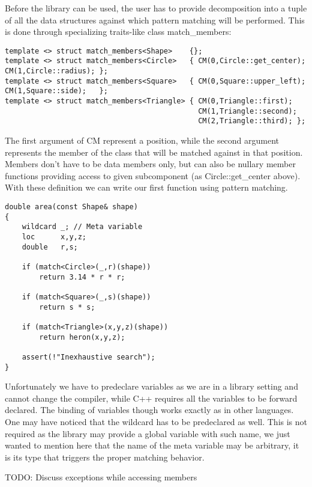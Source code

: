 \documentclass[submission,copyright]{eptcs}
\begin{document}
Before the library can be used, the user has to provide decomposition into a 
tuple of all the data structures against which pattern matching will be 
performed. This is done through specializing traits-like class match\_members:

\begin{lstlisting}
template <> struct match_members<Shape>    {};
template <> struct match_members<Circle>   { CM(0,Circle::get_center); CM(1,Circle::radius); };
template <> struct match_members<Square>   { CM(0,Square::upper_left); CM(1,Square::side);   };
template <> struct match_members<Triangle> { CM(0,Triangle::first);    
                                             CM(1,Triangle::second); 
                                             CM(2,Triangle::third); };
\end{lstlisting}

The first argument of CM represent a position, while the second argument 
represents the member of the class that will be matched against in that position. 
Members don't have to be data members only, but can also be nullary member 
functions providing access to given subcomponent (as Circle::get\_center above).
With these definition we can write our first function using pattern matching.

\begin{lstlisting}
double area(const Shape& shape)
{
    wildcard _; // Meta variable
    loc      x,y,z;
    double   r,s;

    if (match<Circle>(_,r)(shape))
        return 3.14 * r * r;

    if (match<Square>(_,s)(shape))
        return s * s;

    if (match<Triangle>(x,y,z)(shape))
        return heron(x,y,z);

    assert(!"Inexhaustive search");
}
\end{lstlisting}

Unfortunately we have to predeclare variables as we are in a library setting and 
cannot change the compiler, while C++ requires all the variables to be forward 
declared. The binding of variables though works exactly as in other languages. 
One may have noticed that the wildcard has to be predeclared as well. This is 
not required as the library may provide a global variable with such name, we 
just wanted to mention here that the name of the meta variable may be arbitrary, 
it is its type that triggers the proper matching behavior.

TODO: Discuss exceptions while accessing members
\end{document}
